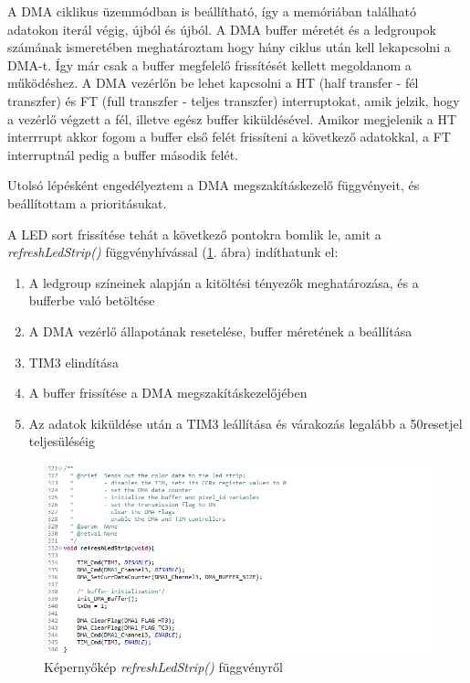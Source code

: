 \documentclass[../main.tex]{subfiles}
\begin{document}
             A DMA ciklikus üzemmódban is beállítható, így a memóriában található adatokon iterál végig, újból és újból. A DMA buffer méretét és a ledgroupok számának ismeretében meghatároztam hogy hány ciklus után kell lekapcsolni a DMA-t. Így már csak a buffer megfelelő frissítését kellett megoldanom a működéshez. A DMA vezérlőn be lehet kapcsolni a HT (half transfer - fél transzfer) és FT (full transzfer - teljes transzfer) interruptokat, amik jelzik, hogy a vezérlő végzett a fél, illetve egész buffer kiküldésével. Amikor megjelenik a HT interrrupt akkor fogom a buffer első felét frissíteni a következő adatokkal, a FT interruptnál pedig a buffer második felét.
             
             Utolsó lépésként engedélyeztem a DMA megszakításkezelő függvényeit, és beállítottam a prioritásukat.
             
             A LED sort frissítése tehát a következő pontokra bomlik le, amit a \textit{refreshLedStrip()} függvényhívással (\ref{fig:ws2811_refreshledstrip}. ábra) indíthatunk el:
            \begin{enumerate}
                \item A ledgroup színeinek alapján a kitöltési tényezők meghatározása, és a bufferbe való betöltése
                \item A DMA vezérlő állapotának resetelése, buffer méretének a beállítása
                \item TIM3 elindítása
                \item A buffer frissítése a DMA megszakításkezelőjében
                \item Az adatok kiküldése után a TIM3 leállítása és várakozás legalább a 50\micros resetjel teljesüléséig
            \end{enumerate}
            
            \begin{figure}[h!]
                \centering
                    \includegraphics[width=12cm]{mbed_res/ws2811_refreshLedStrip}
                \caption{Képernyőkép \textit{refreshLedStrip()} függvényről}
                \label{fig:ws2811_refreshledstrip}
            \end{figure}
            
\end{document}
